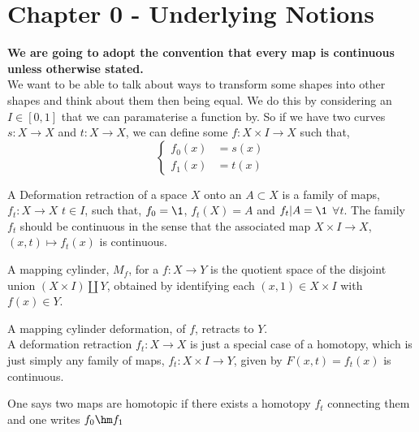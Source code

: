\documentclass{article}
\begin{document}


\section{Chapter 0 - Underlying Notions}
{\centering \textbf{We are going to adopt the convention that every map is continuous unless otherwise stated.}}\\

\noindent
We want to be able to talk about ways to transform some shapes into other shapes and think about them then being equal. We do this by considering an $I \in [0, 1]$ that we can paramaterise a function by. So if we have two curves $s : X \to X$ and $t : X \to X$, we can define some $f : X \times I \to X$ such that,
$$ \begin{cases}
  f_0(x) &= s(x) \\
  f_1(x) &= t(x)
\end{cases} $$

\begin{ndefi}
  A Deformation retraction of a space $X$ onto an $A \subset X$ is a family of maps, $f_t : X \to X$ $t \in I$, such that, $f_0 = \1$, $f_t(X) = A$ and $f_t | A = \1$ $\forall t$. The family $f_t$ should be continuous in the sense that the associated map $X \times I \to X$, $(x, t) \mapsto f_t(x)$ is continuous.
\end{ndefi}

\begin{ndefi}
  A mapping cylinder, $M_f$, for a $f : X \to Y$ is the quotient space of the disjoint union $(X \times I)\coprod Y$, obtained by identifying each $(x, 1) \in X \times I$ with $f(x) \in Y$.
\end{ndefi}

A mapping cylinder deformation, of $f$, retracts to $Y$.\\

A deformation retraction $f_t : X \to X$ is just a special case of a homotopy, which is just simply any family of maps, $f_t : X \times I \to Y$, given by $F(x, t) = f_t (x)$ is continuous.

\begin{ndefi}[Homotopic]
  One says two maps are homotopic if there exists a homotopy $f_t$ connecting them and one writes $f_0 \hm f_1$
\end{ndefi}
\end{document}
